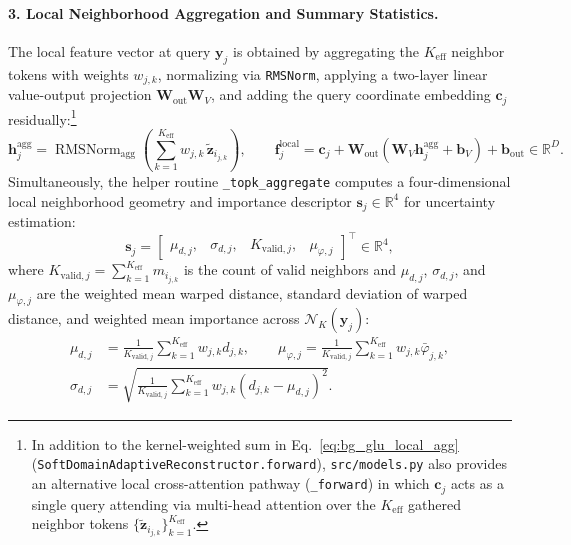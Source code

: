 \paragraph{3. Local Neighborhood Aggregation and Summary Statistics.}
The local feature vector at query $\mathbf{y}_j$ is obtained by aggregating the $K_{\text{eff}}$ neighbor tokens with weights $w_{j,k}$, normalizing via \texttt{RMSNorm}, applying a two-layer linear value-output projection $\mathbf{W}_{\text{out}}\mathbf{W}_V$, and adding the query coordinate embedding $\mathbf{c}_j$ residually:\footnote{In addition to the kernel-weighted sum in Eq.~\eqref{eq:bg_glu_local_agg} (\texttt{SoftDomainAdaptiveReconstructor.forward}), \texttt{src/models.py} also provides an alternative local cross-attention pathway (\texttt{\_forward}) in which $\mathbf{c}_j$ acts as a single query attending via multi-head attention over the $K_{\text{eff}}$ gathered neighbor tokens $\{\tilde{\mathbf{z}}_{i_{j,k}}\}_{k=1}^{K_{\text{eff}}}$.}
\begin{equation}
    \mathbf{h}_j^{\text{agg}} = \operatorname{RMSNorm}_{\text{agg}}\!\left(\sum_{k=1}^{K_{\text{eff}}} w_{j,k} \, \tilde{\mathbf{z}}_{i_{j,k}}\right), \qquad \mathbf{f}_j^{\text{local}} = \mathbf{c}_j + \mathbf{W}_{\text{out}}\!\left(\mathbf{W}_V \mathbf{h}_j^{\text{agg}} + \mathbf{b}_V\right) + \mathbf{b}_{\text{out}} \in \mathbb{R}^D.
    \label{eq:bg_glu_local_agg}
\end{equation}
Simultaneously, the helper routine \texttt{\_topk\_aggregate} computes a four-dimensional local neighborhood geometry and importance descriptor $\mathbf{s}_j \in \mathbb{R}^4$ for uncertainty estimation:
\begin{equation}
    \mathbf{s}_j = \begin{bmatrix} \mu_{d,j}, & \sigma_{d,j}, & K_{\text{valid},j}, & \mu_{\varphi,j} \end{bmatrix}^\top \in \mathbb{R}^4,
    \label{eq:bg_glu_stats_vec}
\end{equation}
where $K_{\text{valid},j} = \sum_{k=1}^{K_{\text{eff}}} m_{i_{j,k}}$ is the count of valid neighbors and $\mu_{d,j}$, $\sigma_{d,j}$, and $\mu_{\varphi,j}$ are the weighted mean warped distance, standard deviation of warped distance, and weighted mean importance across $\mathcal{N}_K(\mathbf{y}_j)$:
\begin{equation}
\begin{aligned}
    \mu_{d,j} &= \frac{1}{K_{\text{valid},j}}\sum_{k=1}^{K_{\text{eff}}} w_{j,k} d_{j,k}, \qquad
    \mu_{\varphi,j} = \frac{1}{K_{\text{valid},j}}\sum_{k=1}^{K_{\text{eff}}} w_{j,k}\bar{\varphi}_{j,k}, \\
    \sigma_{d,j} &= \sqrt{\frac{1}{K_{\text{valid},j}}\sum_{k=1}^{K_{\text{eff}}} w_{j,k}(d_{j,k} - \mu_{d,j})^2}.
\end{aligned}
\label{eq:bg_glu_stats_components}
\end{equation}

